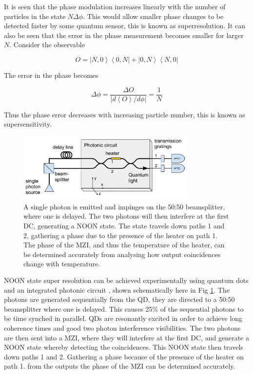 It is seen that the phase modulation increases linearly with the number of
particles in the state $N\Delta \phi$. This would allow smaller phase changes to
be detected faster by some quantum sensor, this is known as superresolution.
It can also be seen that the error in the phase measurement becomes smaller for
larger $N$. Consider the observable

\begin{equation} O = \left|N, 0\right\rangle \left\langle 0, N\right| + \left|0,
N\right\rangle \left\langle N, 0\right| \end{equation}

The error in the phase becomes

\begin{equation} \Delta \phi = \frac{\Delta O}{ | d \left\langle O \right\rangle /
d \phi | } = \frac{1}{N} \end{equation}

Thus the phase error decreases with increasing particle number, this is known as
supersensitivity.

\begin{figure}[h!] \begin{center}
\includegraphics[width=0.8\textwidth]{images/noon.pdf} \end{center}
\caption{
A single photon is emitted and impinges on the 50:50 beamsplitter, where one is
delayed. The two photons will then interfere at the first DC, generating a NOON
state. The state travels down paths 1 and 2, gathering a phase due to the
presence of the heater on path 1. The phase of the MZI, and thus the temperature
of the heater, can be determined accurately from analysing how output
coincidences change with temperature.
} \label{fig:noon-chip} \end{figure}

NOON state super resolution can be achieved experimentally using quantum dots
and an integrated photonic circuit \cite{bennett2015cavity}, shown schematically
here in Fig \ref{fig:noon-chip}.
The photons are generated sequentially from the QD, they are directed to a 50:50
beamsplitter where one is delayed. This causes 25\% of the sequential photons
to be time synched in parallel. QDs are resonantly excited in order to achieve
long coherence times and good two photon interference visibilities. The two photons
are then sent into a MZI, where they will interfere at the first DC, and generate a
NOON state whereby detecting the coincidences. This NOON state then travels down paths
1 and 2. Gathering a phase because of the presence of the heater on path 1.
from the outputs the phase of the MZI can be determined accurately.

